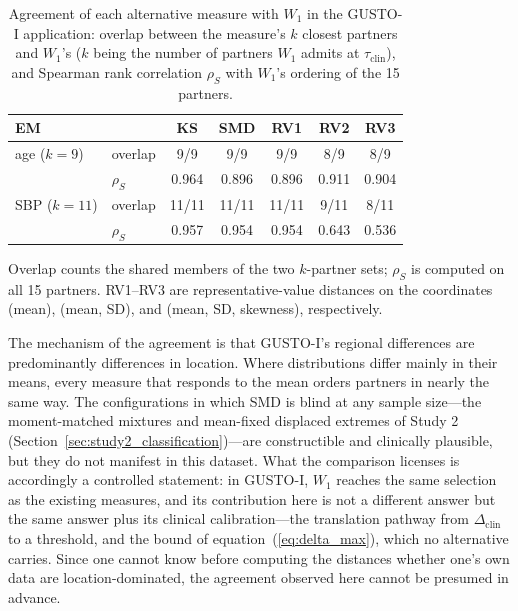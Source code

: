 \documentclass[AMA,Times1COL]{WileyNJDv5}
\begin{document}
\begin{table}[ht]
\centering
\caption{Agreement of each alternative measure with $W_1$ in the GUSTO-I application: overlap between the measure's $k$ closest partners and $W_1$'s ($k$ being the number of partners $W_1$ admits at $\tau_{\text{clin}}$), and Spearman rank correlation $\rho_S$ with $W_1$'s ordering of the 15 partners.\label{tab:app_allmethods}}
\begin{tabular}{llccccc}
\toprule
\textbf{EM} & & \textbf{KS} & \textbf{SMD} & \textbf{RV1} & \textbf{RV2} & \textbf{RV3} \\
\midrule
age ($k=9$)  & overlap  & 9/9 & 9/9 & 9/9 & 8/9 & 8/9 \\
             & $\rho_S$ & 0.964 & 0.896 & 0.896 & 0.911 & 0.904 \\
SBP ($k=11$) & overlap  & 11/11 & 11/11 & 11/11 & 9/11 & 8/11 \\
             & $\rho_S$ & 0.957 & 0.954 & 0.954 & 0.643 & 0.536 \\
\bottomrule
\end{tabular}
\begin{tablenotes}
\item Overlap counts the shared members of the two $k$-partner sets; $\rho_S$ is computed on all 15 partners. RV1--RV3 are representative-value distances on the coordinates (mean), (mean, SD), and (mean, SD, skewness), respectively.
\end{tablenotes}
\end{table}

The mechanism of the agreement is that GUSTO-I's regional differences are predominantly differences in location. Where distributions differ mainly in their means, every measure that responds to the mean orders partners in nearly the same way. The configurations in which SMD is blind at any sample size---the moment-matched mixtures and mean-fixed displaced extremes of Study 2 (Section~\ref{sec:study2_classification})---are constructible and clinically plausible, but they do not manifest in this dataset. What the comparison licenses is accordingly a controlled statement: in GUSTO-I, $W_1$ reaches the same selection as the existing measures, and its contribution here is not a different answer but the same answer plus its clinical calibration---the translation pathway from $\Delta_{\text{clin}}$ to a threshold, and the bound of equation~(\ref{eq:delta_max}), which no alternative carries. Since one cannot know before computing the distances whether one's own data are location-dominated, the agreement observed here cannot be presumed in advance.
\end{document}
